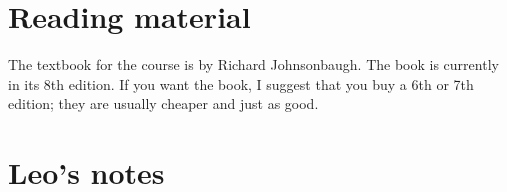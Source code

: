 \documentclass[letterpaper,10pt,english]{sphinxmanual}
\begin{document}
\section{Reading material}
\label{\detokenize{COMP163/reading:reading-material}}\label{\detokenize{COMP163/reading::doc}}
The  textbook for the course is  by Richard Johnsonbaugh. The book is currently in its 8th edition. If you want the book, I suggest that you buy a 6th or 7th edition; they are usually cheaper and just as good.


\section{Leo’s notes}
\label{\detokenize{COMP163/notes:leo-s-notes}}\label{\detokenize{COMP163/notes::doc}}
\end{document}
